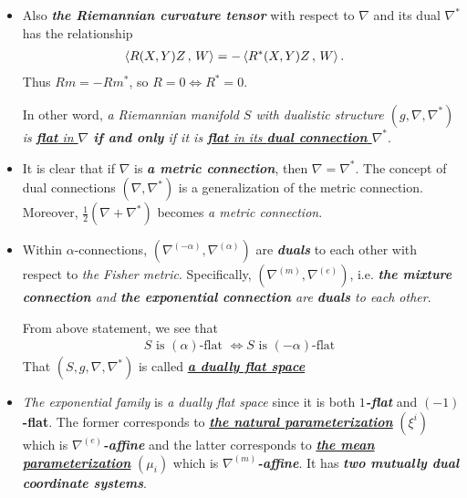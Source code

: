 \documentclass[11pt]{article}
\begin{document}
\begin{itemize}
\item Also \emph{\textbf{the Riemannian curvature tensor}} with respect to $\nabla$ and its dual $\nabla^{*}$ has the relationship
\begin{align*}
\left\langle R(X,Y)Z\,,\, W \right\rangle &= -\left\langle R^{*}(X,Y)Z\,,\, W \right\rangle.
\end{align*} Thus $Rm = -Rm^{*}$, so $R = 0 \Leftrightarrow R^{*} = 0$. 

In other word, \emph{a Riemannian manifold $S$ with dualistic structure $(g, \nabla, \nabla^{*})$ is \underline{\textbf{flat} in $\nabla$} \textbf{if and only} if it is \underline{\textbf{flat} in its \textbf{dual connection} $\nabla^{*}$}}.


\item It is clear that if $\nabla$ is \emph{\textbf{a metric connection}}, then $\nabla = \nabla^{*}$. The concept of dual connections $(\nabla, \nabla^{*})$ is a generalization of the metric connection. Moreover, $\frac{1}{2}(\nabla + \nabla^{*})$ becomes \emph{a metric connection}. 


\item Within $\alpha$-connections, $(\nabla^{(-\alpha)}, \nabla^{(\alpha)})$ are \textbf{\emph{duals}} to each other with respect to \emph{the Fisher metric}. Specifically, $(\nabla^{(m)}, \nabla^{(e)})$, i.e. \textit{\textbf{the mixture connection} and \textbf{the exponential connection} are \textbf{duals} to each other}.

From above statement, we see that 
\begin{align}
S \text{ is $(\alpha)$-flat } \Leftrightarrow S \text{ is $(-\alpha)$-flat }\label{eqn: dual_flat}
\end{align} That $(S, g, \nabla, \nabla^{*})$ is called \underline{\emph{\textbf{a dually flat space}}}

\item \begin{remark}
\emph{The exponential family} is \emph{a dually flat space} since it is both \emph{\textbf{$1$-flat}} and \textbf{$(-1)$-flat}. The former corresponds to \underline{\emph{\textbf{the natural parameterization}}} $(\xi^i)$ which is \emph{\textbf{$\nabla^{(e)}$-affine}} and the latter corresponds to \underline{\emph{\textbf{the mean parameterization}}} $(\mu_i)$ which is \emph{\textbf{$\nabla^{(m)}$-affine}}.  It has \emph{\textbf{two mutually dual coordinate systems}}.
\end{remark}

\end{itemize}
\end{document}
